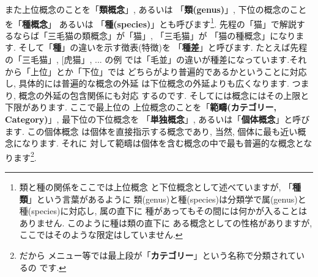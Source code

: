 また上位概念のことを「\textbf{類概念}」, あるいは
「\textbf{類(genus)}」, 下位の概念のことを「\textbf{種概念}」 あるいは
「\textbf{種(species)}」とも呼びます\footnote{類と種の関係をここでは上位概念
と下位概念として述べていますが, 「\textbf{種類}」という言葉があるように
類(genus)と種(species)は分類学で属(genus)と種(species)に対応し, 属の直下に
種があってもその間には何かが入ることはありません. このように種は類の直下に
ある概念としての性格がありますが, ここではそのような限定はしていません.}.
 先程の「猫」で解説するならば「三毛猫の類概念」が「猫」, 「三毛猫」が
「猫の種概念」になります. そして「\textbf{種}」の違いを示す徴表(特徴)を
「\textbf{種差}」と呼びます. たとえば先程の「三毛猫」, [虎猫」, ... の例
では「毛並」の違いが種差になっています.それから「上位」とか「下位」では
どちらがより普遍的であるかということに対応し, 具体的には普遍的な概念の外延
は下位概念の外延よりも広くなります. つまり, 概念の外延の包含関係にも対応
するのです. そしてには概念にはその上限と下限があります. ここで最上位の
上位概念のことを「\textbf{範疇(カテゴリー, Category)}」, 最下位の下位概念を
「\textbf{単独概念}」, あるいは「\textbf{個体概念}」と呼びます. この個体概念
は個体を直接指示する概念であり, 当然, 個体に最も近い概念になります. それに
対して範疇は個体を含む概念の中で最も普遍的な概念となります\footnote{だから
メニュー等では最上段が「\textbf{カテゴリー}」という名称で分類されているの
です.}.
\newline


